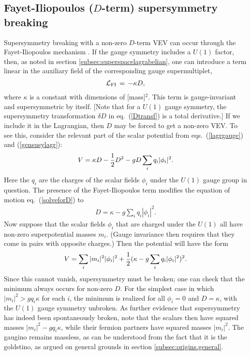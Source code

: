 \documentclass[11pt]{article}
\def\beq{\begin{eqnarray}}
\def\eeq{\end{eqnarray}}
\def\lagr{{\cal L}}
\begin{document}
\subsection{Fayet-Iliopoulos ($D$-term) supersymmetry breaking
\label{subsec:origins.Dterm}}
\setcounter{equation}{0}
\setcounter{footnote}{1}

Supersymmetry breaking with a non-zero $D$-term VEV can occur through the
Fayet-Iliopoulos mechanism \cite{FayetIliopoulos}. If the gauge symmetry
includes a $U(1)$ factor, then, as noted in section \ref{subsec:superspacelagrabelian}, 
one can introduce a term linear in the
auxiliary field of the corresponding gauge supermultiplet,
\beq
\lagr_{\rm FI} \,=\, -\kappa D,
\label{FI}
\eeq
where $\kappa$ is a constant with dimensions of [mass]$^2$. This
term is gauge-invariant and supersymmetric by itself. [Note that for a
$U(1)$ gauge symmetry, the supersymmetry transformation $\delta D$ in
eq.~(\ref{Dtransf}) is a total derivative.] If we include it in the
Lagrangian, then $D$ may be forced to get a non-zero VEV. To see this,
consider the relevant part of the scalar potential from
eqs.~(\ref{lagrgauge}) and (\ref{gensusylagr}):
\beq
V = \kappa D -{1\over 2} D^2 - g D \sum_i q_i |\phi_i|^2 .
\eeq
Here the $q_i$ are the charges of the scalar fields $\phi_i$ under the
$U(1)$ gauge group in question. The presence of the Fayet-Iliopoulos term
modifies the equation of motion eq.~(\ref{solveforD}) to
\beq
D = \kappa - g \sum_i q_i |\phi_i|^2.
\label{booya}
\eeq
Now suppose that the scalar fields $\phi_i$ that are charged under the
$U(1)$ all have non-zero superpotential masses $m_i$. (Gauge invariance
then requires that they come in pairs with opposite charges.) Then the
potential will have the form
\beq
V  = \sum_i |m_i|^2 |\phi_i|^2 +
     {1\over 2} (\kappa -g \sum_i q_i |\phi_i|^2)^2 .
\eeq
Since this cannot vanish, supersymmetry must be broken; one can check that
the minimum always occurs for non-zero $D$. For the simplest case in which
$|m_i|^2 > g q_i \kappa$ for each $i$, the minimum is realized for all
$\phi_i=0$ and $D = \kappa$, with the $U(1)$ gauge symmetry unbroken.  As
further evidence that supersymmetry has indeed been spontaneously broken,
note that the scalars then have squared masses $|m_i|^2 - g q_i \kappa$,
while their fermion partners have squared masses $|m_i|^2$. The gaugino
remains massless, as can be understood from the fact that
it is the goldstino, as argued on general
grounds in section \ref{subsec:origins.general}.
\end{document}
